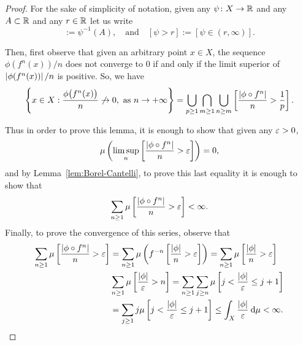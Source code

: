 \begin{proof}
  For the sake of simplicity of notation, given any $\psi\colon X\to \mathbb{R}$ and any $A\subset\mathbb{R}$ and any $r\in\mathbb{R}$ let us write
  \begin{displaymath}
    [\psi \in A]:=\psi^{-1}(A), \quad\text{and}\quad [\psi>r]:=[\psi\in (r,\infty)].
  \end{displaymath}

  Then, first observe that given an arbitrary point $x\in X$, the sequence $\phi(f^{n}(x))/n$ does not converge to $0$ if and only if the limit superior of $\left\lvert{\phi(f^{n}(x))}\right\rvert/n$ is positive. So, we have
  \begin{displaymath}
    \left\{x\in X : \frac{\phi\big(f^{n}(x)\big)}{n}\not\to 0,\ \text{as } n\to+\infty\right\} = \bigcup_{p\geq 1} \bigcap_{m\geq 1} \bigcup_{n\geq m} \left[\frac{\left\lvert{\phi\circ f^{n}}\right\rvert}{n} > \frac{1}{p}\right].
  \end{displaymath}

  Thus in order to prove this lemma, it is enough to show that given any $\varepsilon>0$,
  \begin{displaymath}
    \mu\left(\limsup_{n} \left[\frac{\left\lvert{\phi\circ f^{n}}\right\rvert}{n} > \varepsilon\right]\right) = 0,
  \end{displaymath}
  and by Lemma~\ref{lem:Borel-Cantelli}, to prove this last equality it is enough to show that
  \begin{displaymath}
    \sum_{n\geq 1} \mu\left[\frac{\left\lvert{\phi\circ f^{n}}\right\rvert}{n} > \varepsilon\right]<\infty.
  \end{displaymath}
  Finally, to prove the convergence of this series, observe that
  \begin{displaymath}
    \begin{split}
     \sum_{n\geq 1} \mu\left[\frac{\left\lvert{\phi\circ f^{n}}\right\rvert}{n} > \varepsilon\right] &= \sum_{n\geq 1} \mu\left(f^{-n}\left[\frac{\left\lvert{\phi}\right\rvert}{n} >\varepsilon\right]\right) = \sum_{n\geq 1} \mu\left[\frac{\left\lvert{\phi}\right\rvert}{n}>\varepsilon\right] \\
                                                                           & \sum_{n\geq 1} \mu\left[\frac{\left\lvert{\phi}\right\rvert}{\varepsilon}> n\right] = \sum_{n\geq 1} \sum_{j\geq n} \mu\left[j<\frac{\left\lvert{\phi}\right\rvert}{\varepsilon}\leq j+1\right] \\
                                                                           & = \sum_{j\geq 1} j\mu\left[j<\frac{\left\lvert{\phi}\right\rvert}{\varepsilon}\leq j+1\right] \leq \int_{X}\frac{\left\lvert{\phi}\right\rvert}{\varepsilon}\:\mathrm{d}\mu<\infty.
    \end{split}
  \end{displaymath}
\end{proof}

